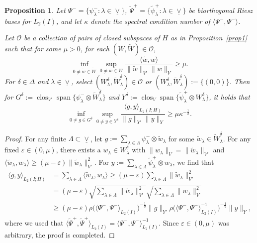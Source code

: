 \documentclass{amsart}
\newtheorem{proposition}[theorem]{Proposition}
\theoremstyle{definition}
\theoremstyle{remark}
\numberwithin{equation}{section}
\newcommand{\eps}{\varepsilon}
\DeclareMathOperator{\clos}{clos}
\DeclareMathOperator{\Span}{span}
\newcommand{\1}{\mathbb 1}
\begin{document}
{\begin{proposition} \label{prop2}
Let $\Psi^-=\{\psi^-_\lambda\colon \lambda \in \underline{\vee}\}$,
$\tilde{\Psi}^+=\{\tilde{\psi}^+_\lambda\colon \lambda \in \underline{\vee}\}$ be biorthogonal Riesz bases for $L_2(I)$, and let $\kappa$ denote the spectral condition number of $\langle \Psi^-,\Psi^-\rangle$.

Let ${\mathcal O}$ be a collection of pairs of closed subspaces of $H$ as in Proposition~\ref{prop1} such that for some $\mu>0$, for each $(W,\tilde W) \in {\mathcal O}$, 
$$
\inf_{0 \neq \tilde w \in \tilde W}\sup_{0 \neq w \in W}\frac{\langle \tilde w,w\rangle}{\|\tilde w\|_{V'}\|w\|_V} \geq \mu.
$$
For $\delta \in \Delta$ and $\lambda \in \underline{\vee}$, select $(W^\delta_\lambda,{\tilde W}^\delta_\lambda) \in {\mathcal O}$ or $(W^\delta_\lambda,{\tilde W}^\delta_\lambda):=\{(0,0)\}$. Then for $G^\delta:=\clos_{V'} \Span \{\psi^-_\lambda \otimes \tilde{W}^\delta_\lambda\}$ and $Y^\delta:=\clos_{V} \Span \{\tilde{\psi}^+_\lambda \otimes W^\delta_\lambda\}$, it holds that
$$
\inf_{0 \neq g \in G^\delta}\sup_{0 \neq y \in Y^\delta} \frac{\langle g, y\rangle_{L_2(I;H)}}{\|g\|_{Y'} \|y\|_Y} \geq \mu \kappa^{-\frac12}.
$$
\end{proposition}


\begin{proof} For any finite $\Lambda \subset \underline{\vee}$, let $g:=\sum_{\lambda \in \Lambda} \psi^-_\lambda \otimes \tilde{w}_\lambda$ for some ${\tilde w}_\lambda \in {\tilde W}^\delta_\lambda$. For any fixed $\eps \in (0,\mu)$, there exists a $w_\lambda \in W^\delta_\lambda$ with $\|w_\lambda\|_V=\|\tilde{w}_\lambda\|_{V'}$ and $\langle \tilde{w}_\lambda,w_\lambda\rangle \geq (\mu-\eps) \|\tilde{w}_\lambda\|_{V'}^2$.
For $y:=\sum_{\lambda \in \Lambda} \tilde{\psi}^+_\lambda \otimes w_\lambda$, we find that
\begin{align*}
\langle g, y\rangle_{L_2(I;H)} &= \sum_{\lambda \in \Lambda} \langle \tilde{w}_\lambda,w_\lambda\rangle
\geq (\mu-\eps) \sum_{\lambda \in \Lambda}\|\tilde{w}_\lambda\|_{V'}^2\\
&=(\mu-\eps) \sqrt{\sum_{\lambda \in \Lambda} \|\tilde{w}_\lambda\|_{V'}^2}
\sqrt{\sum_{\lambda \in \Lambda} \|w_\lambda\|_{V}^2}\\
&\geq  (\mu-\eps)\rho\big(\langle \Psi^-,\Psi^-\rangle_{L_2(I)}\big)^{-\frac12}\big\| g\big\|_{Y'}
\rho\big(\langle \Psi^-,\Psi^-\rangle_{L_2(I)}^{-1}\big)^{-\frac12} \big\|y\|_{Y},
\end{align*}
where we used that $\langle \tilde{\Psi}^+,\tilde{\Psi}^+\rangle_{L_2(I)}=\langle \Psi^-,\Psi^-\rangle_{L_2(I)}^{-1}$. Since $\eps \in (0,\mu)$ was arbitrary, the proof is completed.
\end{proof}

}
\end{document}
